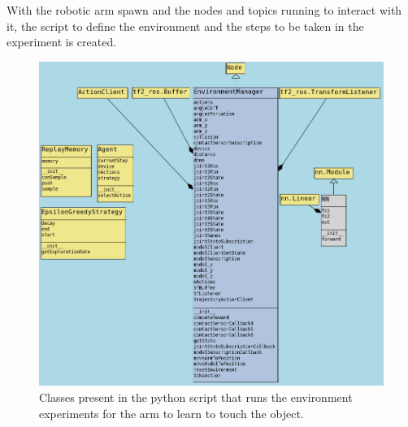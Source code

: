 \documentclass[12pt,oneside]{article}
\begin{document}
With the robotic arm spawn and the nodes and topics running to interact with it, the script to define the environment and the steps to be taken in the experiment is created. 

\begin{figure}[H]
\centering
\includegraphics[width=0.95\linewidth]{classDiagramComplete}
\caption{Classes present in the python script that runs the environment experiments for the arm to learn to touch the object.}
\label{fig:classdiagramcomplete}
\end{figure}
\end{document}
